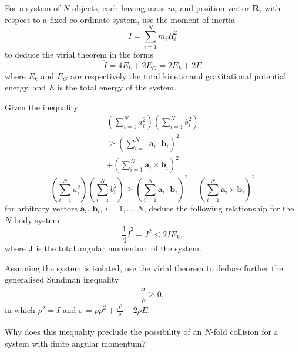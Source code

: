 \documentclass[compose]{exam-n}
\begin{document}
\begin{question}{30} 
For a system of  $N$ objects, each having mass  $m_i$ and position
vector $\mathbf{R}_i$ with respect to a fixed co-ordinate system,
use the moment of inertia
\[
I=\sum_{i=1}^N m_i R_i^2
\]
to deduce the virial theorem in the forms
\[
\ddot{I}=4E_k+2E_G=2E_k+2E
\]
where $E_k$  and $E_G$  are respectively the total kinetic and
gravitational potential energy, and $E$  is the total energy of
the system.

Given the inequality
\ifbigfont
  \begin{multline*}
  \left(\sum_{i=1}^N
  a_i^2\right) \left(\sum_{i=1}^N b_i^2\right) \\
\ge \left(\sum_{i=1}^N \mathbf{a}_i\cdot\mathbf{b}_i\right)^2 \\
+ \left(\sum_{i=1}^N \mathbf{a}_i\times\mathbf{b}_i\right)^2
  \end{multline*}
\else
  \begin{equation*}
  \left(\sum_{i=1}^N
  a_i^2\right) \left(\sum_{i=1}^N b_i^2\right) \ge \left(\sum_{i=1}^N
  \mathbf{a}_i\cdot\mathbf{b}_i\right)^2 + \left(\sum_{i=1}^N
  \mathbf{a}_i\times\mathbf{b}_i\right)^2
  \end{equation*}
\fi
for arbitrary vectors $\mathbf{a}_i$, $\mathbf{b}_i$,
$i=1,\ldots,N$, deduce the following relationship for the $N$-body
system
\begin{equation*}
\frac{1}{4}\dot{I}^2+J^2\le 2IE_k,
\end{equation*}
where $\mathbf{J}$ is the total angular momentum of the system.

Assuming the system is isolated, use the virial theorem to deduce
further the generalised Sundman inequality
\begin{equation*}
\frac{\dot{\sigma}}{\dot{\rho}}\ge 0,
\end{equation*}
in which $\rho^2=I$  and
$\displaystyle\sigma=\rho\dot{\rho}^2+\frac{J^2}{\rho}-2\rho E $.

Why  does  this  inequality  preclude  the  possibility  of an
$N$-fold collision for a system with finite angular momentum?

\end{question}
\end{document}
